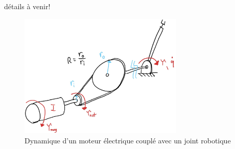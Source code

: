 détails à venir!

\begin{figure}[ht]
	\centering
		\includegraphics[width=0.70\textwidth]{fig/actuator_dynamic.jpg}
	\caption{Dynamique d'un moteur électrique couplé avec un joint robotique}%
	\label{fig:actuator_dynamic}
\end{figure}












